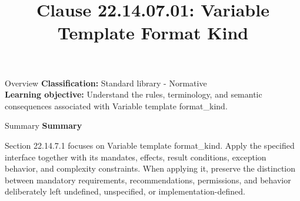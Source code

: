 \documentclass[10pt,letterpaper]{article}
\title{Clause 22.14.07.01: Variable Template Format Kind}
\author{}
\date{}
\begin{document}
\maketitle
\begin{CornellOverviewBox}{Overview}
\textbf{Classification:} Standard library - Normative\\[2pt]
\textbf{Learning objective:} Understand the rules, terminology, and semantic consequences associated with Variable template format\_kind.
\end{CornellOverviewBox}\begin{CornellSummaryBox}{Summary}
{\sffamily\bfseries\color{Accent} Summary}\par\vspace{3pt}Section 22.14.7.1 focuses on Variable template format\_kind. Apply the specified interface together with its mandates, effects, result conditions, exception behavior, and complexity constraints. When applying it, preserve the distinction between mandatory requirements, recommendations, permissions, and behavior deliberately left undefined, unspecified, or implementation-defined.
\end{CornellSummaryBox}
\end{document}
